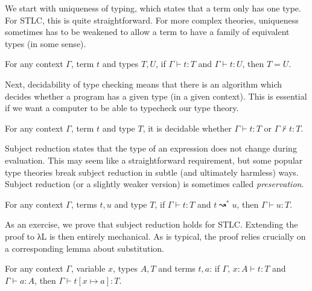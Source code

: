 \documentclass{article}
\theoremstyle{definition}
\begin{document}
We start with uniqueness of typing, which states that a term only has one type.
For STLC, this is quite straightforward.
For more complex theories, uniqueness sometimes has to be weakened to allow a term to have a family of equivalent types (in some sense).

\begin{theorem}
  For any context $Γ$, term $t$ and types $T,U$, if $Γ ⊢ t : T$ and $Γ ⊢ t : U$, then $T = U$.
\end{theorem}

Next, decidability of type checking means that there is an algorithm which decides whether a program has a given type (in a given context).
This is essential if we want a computer to be able to typecheck our type theory.

\begin{theorem}
  For any context $Γ$, term $t$ and type $T$, it is decidable whether $Γ ⊢ t : T$ or $Γ ⊬ t : T$.
\end{theorem}

Subject reduction states that the type of an expression does not change during evaluation.
This may seem like a straightforward requirement, but some popular type theories break subject reduction in subtle (and ultimately harmless) ways.
Subject reduction (or a slightly weaker version) is sometimes called \emph{preservation}.

\begin{theorem}\label{th:subject-reduction}
  For any context $Γ$, terms $t,u$ and type $T$, if $Γ ⊢ t : T$ and $t ↝^{*} u$, then $Γ ⊢ u : T$.
\end{theorem}

As an exercise, we prove that subject reduction holds for STLC.
Extending the proof to λL is then entirely mechanical.
As is typical, the proof relies crucially on a corresponding lemma about substitution.

\begin{lemma}\label{th:subst-typing}
  For any context $Γ$, variable $x$, types $A, T$ and terms $t, a$: if $Γ,\, x : A ⊢ t : T$ and $Γ ⊢ a : A$, then $Γ ⊢ t[x ↦ a] : T$.
\end{lemma}
\end{document}
